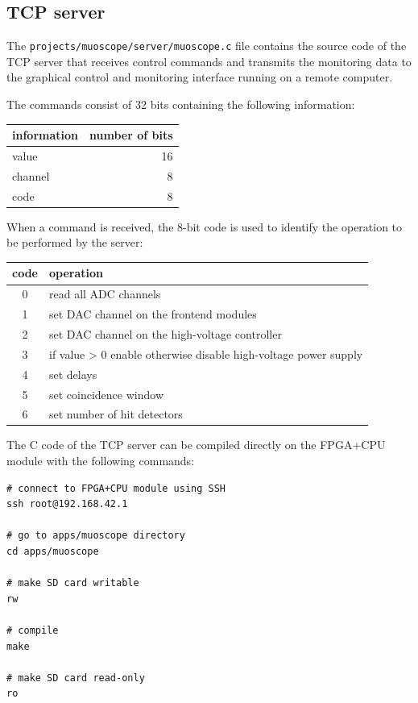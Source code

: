 \documentclass[12pt, a4paper]{article}
\begin{document}
\subsection{TCP server}

The \texttt{projects/muoscope/server/muoscope.c} file contains the source code of the TCP server that receives control commands and transmits the monitoring data to the graphical control and monitoring interface running on a remote computer.

The commands consist of 32 bits containing the following information:
\begin{center}
  \begin{tabular}{|l|r|}
  \hline
  \textbf{information} & \textbf{number of bits} \\
  \hline
  value & 16 \\
  \hline
  channel & 8 \\
  \hline
  code & 8 \\
  \hline
  \end{tabular}
\end{center}

When a command is received, the 8-bit code is used to identify the operation to be performed by the server:
\begin{center}
  \begin{tabular}{|c|l|}
  \hline
  \textbf{code} & \textbf{operation} \\
  \hline
  0 & read all ADC channels \\
  \hline
  1 & set DAC channel on the frontend modules \\
  \hline
  2 & set DAC channel on the high-voltage controller \\
  \hline
  3 & if value > 0 enable otherwise disable high-voltage power supply \\
  \hline
  4 & set delays \\
  \hline
  5 & set coincidence window \\
  \hline
  6 & set number of hit detectors \\
  \hline
  \end{tabular}
\end{center}

The C code of the TCP server can be compiled directly on the FPGA+CPU module with the following commands:
\vspace{-1ex}
\begin{verbatim}
# connect to FPGA+CPU module using SSH
ssh root@192.168.42.1

# go to apps/muoscope directory
cd apps/muoscope

# make SD card writable
rw

# compile
make

# make SD card read-only
ro
\end{verbatim}
\end{document}
